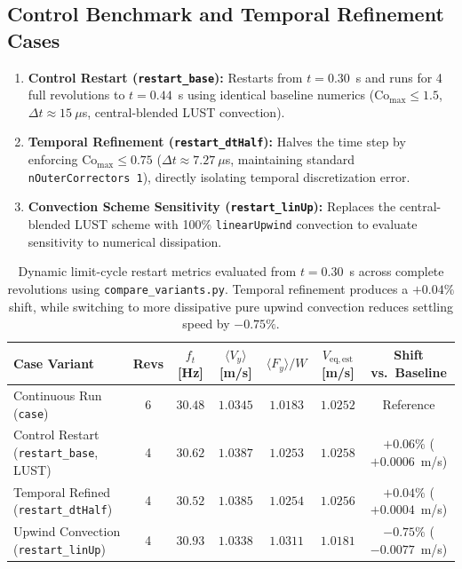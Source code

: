 \documentclass[11pt,a4paper]{article}
\begin{document}
\subsection{Control Benchmark and Temporal Refinement Cases}
\begin{enumerate}
    \item \textbf{Control Restart (\texttt{restart\_base}):} Restarts from $t = 0.30$~s and runs for 4 full revolutions to $t = 0.44$~s using identical baseline numerics ($\mathrm{Co}_{\mathrm{max}} \le 1.5$, $\Delta t \approx 15\ \mu$s, central-blended LUST convection).
    \item \textbf{Temporal Refinement (\texttt{restart\_dtHalf}):} Halves the time step by enforcing $\mathrm{Co}_{\mathrm{max}} \le 0.75$ ($\Delta t \approx 7.27\ \mu$s, maintaining standard \texttt{nOuterCorrectors 1}), directly isolating temporal discretization error.
    \item \textbf{Convection Scheme Sensitivity (\texttt{restart\_linUp}):} Replaces the central-blended LUST scheme with 100\% \texttt{linearUpwind} convection to evaluate sensitivity to numerical dissipation.
\end{enumerate}

\begin{table}[htbp]
\centering
\small
\begin{tabularx}{\textwidth}{>{\raggedright\arraybackslash}X c c c c c c}
\toprule
\textbf{Case Variant} & \textbf{Revs} & \textbf{$f_t$ [Hz]} & \textbf{$\langle V_y \rangle$ [m/s]} & \textbf{$\langle F_y \rangle / W$} & \textbf{$V_{\mathrm{eq,est}}$ [m/s]} & \textbf{Shift vs.\ Baseline} \\
\midrule
Continuous Run (\texttt{case}) & 6 & $30.48$ & $1.0345$ & $1.0183$ & $1.0252$ & Reference \\
Control Restart (\texttt{restart\_base}, LUST) & 4 & $30.62$ & $1.0387$ & $1.0253$ & $1.0258$ & $\mathbf{+0.06\%}$ ($+0.0006$~m/s) \\
Temporal Refined (\texttt{restart\_dtHalf}) & 4 & $30.52$ & $1.0385$ & $1.0254$ & $1.0256$ & $\mathbf{+0.04\%}$ ($+0.0004$~m/s) \\
Upwind Convection (\texttt{restart\_linUp}) & 4 & $30.93$ & $1.0338$ & $1.0311$ & $1.0181$ & $\mathbf{-0.75\%}$ ($-0.0077$~m/s) \\
\bottomrule
\end{tabularx}
\caption{Dynamic limit-cycle restart metrics evaluated from $t = 0.30$~s across complete revolutions using \texttt{compare\_variants.py}. Temporal refinement produces a $+0.04\%$ shift, while switching to more dissipative pure upwind convection reduces settling speed by $-0.75\%$.}
\label{tab:restart_metrics}
\end{table}
\end{document}
